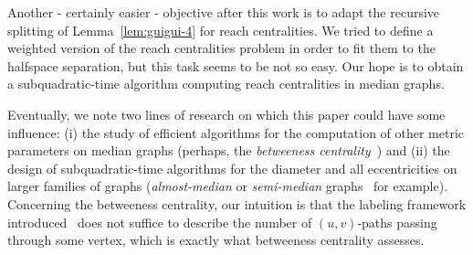 \documentclass{article}
\begin{document}
Another - certainly easier - objective after this work is to adapt the recursive splitting of Lemma~\ref{lem:guigui-4} for reach centralities. We tried to define a weighted version of the reach centralities problem in order to fit them to the halfspace separation, but this task seems to be not so easy. Our hope is to obtain a subquadratic-time algorithm computing reach centralities in median graphs. 

Eventually, we note two lines of research on which this paper could have some influence: (i) the study of efficient algorithms for the computation of other metric parameters on median graphs (perhaps, the \textit{betweeness centrality}~\cite{AbGrWi15}) and (ii) the design of subquadratic-time algorithms for the diameter and all eccentricities on larger families of graphs (\textit{almost-median} or \textit{semi-median} graphs~\cite{Br07,KlSh12} for example). Concerning the betweeness centrality, our intuition is that the labeling framework introduced~\cite{BeHa21} does not suffice to describe the number of $(u,v)$-paths passing through some vertex, which is exactly what betweeness centrality assesses.




\end{document}

